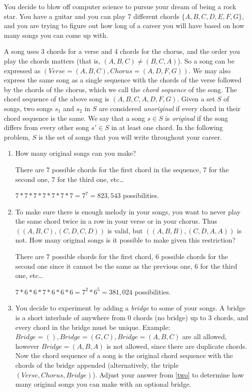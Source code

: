 \documentclass[12pt]{article}
\newcounter{ques}
\newenvironment{question}{\refstepcounter{ques}{\noindent\bf Question \arabic{ques}:}}{\vspace{5mm}}
\begin{document}
\begin{question}	
	You decide to blow off computer science to pursue your dream of being a rock star. You have a guitar and you can play 7 different chords $\{ A,B,C,D,E,F,G\}$, and you are trying to figure out how long of a career you will have based on how many songs you can come up with.
	
	A song uses 3 chords for a verse and 4  chords for the chorus, and the order you play the chords matters (that is, $(A,B,C) \neq (B,C,A)$). So a song can be expressed as $(Verse=(A,B,C),Chorus=(A,D,F,G))$. We may also express the same song as a single sequence with the chords of the verse followed by the chords of the chorus, which we call the \emph{chord sequence} of the song. The chord sequence of the above song is $(A,B,C,A,D,F,G)$. Given a set $S$ of songs, two songs $s_1$ and $s_2$ in $S$ are considered \emph{unoriginal} if every chord in their chord sequence is the same. We say that a song $s\in S$ is \emph{original} if the song differs from every other song $s'\in S$ in at least one chord. In the following problem, $S$ is the set of songs that you will write throughout your career.
	
	\begin{enumerate}[label = (\alph*)]
		\item\label{one} How many original songs can you make?
		
		There are 7 possible chords for the first chord in the sequence, 7 for the second one, 7 for the third one, etc\dots
		
		$7*7*7*7*7*7*7 = 7^7 = 823,543$ possibilities.
		
	
		
		\item\label{two} To make sure there is enough melody in your songs, you want to never play the same chord twice in a row in your verse or in your chorus. Thus $((A,B,C),(C, D, C, D))$ is valid, but $((A,B,B),(C, D, A, A))$ is not. How many original songs is it possible to make given this restriction?
		
		There are 7 possible chords for the first chord, 6 possible chords for the second one since it cannot be the same as the previous one, 6 for the third one, etc\dots

		$7*6*6*7*6*6*6 = 7^2*6^5 = 381,024$ possibilities.
	
		\item\label{bridge} You decide to experiment by adding a \emph{bridge} to some of your songs. A bridge is a short interlude of anywhere from $0$ chords (no bridge) up to $3$ chords, and every chord in the bridge must be unique. Example: $Bridge = (), Bridge = (G,C), Bridge = (A,B,C)$ are all allowed, however $Bridge = (A,B,A)$ is not allowed, since there are duplicate chords. Now the chord sequence of a song is the original chord sequence with the chords of the bridge appended (alternatively, the triple $(Verse, Chorus, Bridge)$). Adjust your answer from \ref{two} to determine how many original songs you can make with an optional bridge. 
		

\end{enumerate}
\end{question}
\end{document}
